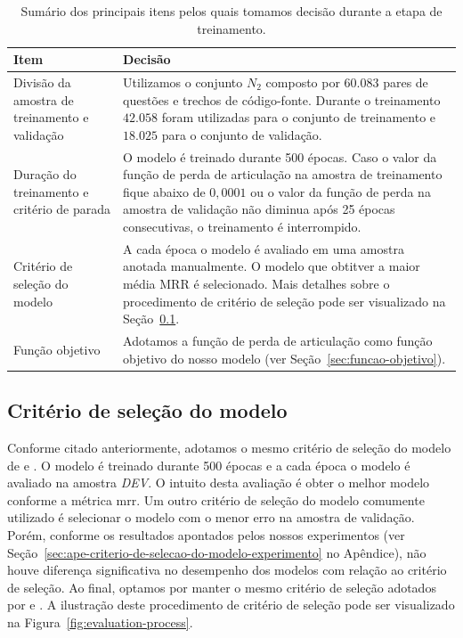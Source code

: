 \begin{table}[h]
\centering
\begin{tabular}{ | p{5cm} | p{10cm} |  }
\hline
\textbf{Item} & \textbf{Decisão} \\
\hline
 Divisão da amostra de treinamento e validação & Utilizamos o conjunto $N_{2}$ composto por $60.083$ pares de questões e trechos de código-fonte. Durante o treinamento $42.058$ foram utilizadas para o conjunto de treinamento e $18.025$ para o conjunto de validação.\\


\hline
 
Duração do treinamento e critério de parada & O modelo é treinado durante 500 épocas. Caso o valor da função de perda de articulação na amostra de treinamento fique abaixo de $0,0001$ ou o valor da função de perda na amostra de validação não diminua após 25 épocas consecutivas, o treinamento é interrompido.\\

 \hline
Critério de seleção do modelo & A cada época o modelo é avaliado em uma amostra anotada manualmente. O modelo que obtitver a maior média MRR é selecionado. Mais detalhes sobre o procedimento de critério de seleção pode ser visualizado na Seção~\ref{sec:criterio-selecao-modelo-treinamento}.\\
 
 \hline
 
 Função objetivo & Adotamos a função de perda de articulação como função objetivo do nosso modelo (ver Seção~\ref{sec:funcao-objetivo}). \\
 
  \hline
 
\end{tabular}
\caption{Sumário dos principais itens pelos quais tomamos decisão durante a etapa de treinamento.}
\label{table:training-decisions}
\end{table}

\subsection{Critério de seleção do modelo}
\label{sec:criterio-selecao-modelo-treinamento}

Conforme citado anteriormente, adotamos o mesmo critério de seleção do modelo de \cite{iyer-etal-2016-summarizing} e \cite{yao-2018}. O modelo é treinado durante 500 épocas e a cada época o modelo é avaliado na amostra \emph{DEV}. O intuito desta avaliação é obter o melhor modelo conforme a métrica \acrshort{mrr}. Um outro critério de seleção do modelo comumente utilizado é selecionar o modelo com o menor erro na amostra de validação. Porém, conforme os resultados apontados pelos nossos experimentos (ver Seção~\ref{sec:ape-criterio-de-selecao-do-modelo-experimento} no Apêndice), não houve diferença significativa no desempenho dos modelos com relação ao critério de seleção. Ao final, optamos por manter o mesmo critério de seleção adotados por \cite{iyer-etal-2016-summarizing} e \cite{yao-2018}. A ilustração deste procedimento de critério de seleção pode ser visualizado na Figura~\ref{fig:evaluation-process}.

